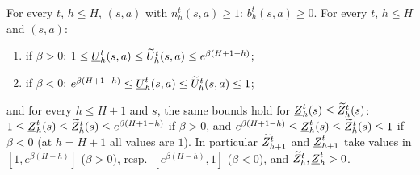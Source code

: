 \begin{lemma}\label{lem:backups_range}
\leanok
{}
For every $t$, $h \le H$, $(s, a)$ with $n_h^t(s, a) \ge 1$: $b_h^t(s, a) \ge 0$. For every $t$,
$h \le H$ and $(s, a)$:
\begin{enumerate}
  \item[(i)] if $\beta > 0$: $1 \le \underline{U}^t_h(s, a) \le \widetilde{U}^t_h(s, a) \le e^{\beta(H + 1 - h)}$;
  \item[(ii)] if $\beta < 0$: $e^{\beta(H + 1 - h)} \le \underline{U}^t_h(s, a) \le \widetilde{U}^t_h(s, a) \le 1$;
\end{enumerate}
and for every $h \le H + 1$ and $s$, the same bounds hold for $\underline{Z}^t_h(s) \le \widetilde{Z}^t_h(s)$:
$1 \le \underline{Z}^t_h(s) \le \widetilde{Z}^t_h(s) \le e^{\beta(H + 1 - h)}$ if $\beta > 0$, and
$e^{\beta(H + 1 - h)} \le \underline{Z}^t_h(s) \le \widetilde{Z}^t_h(s) \le 1$ if $\beta < 0$ (at $h = H + 1$ all
values are $1$). In particular $\widetilde{Z}^t_{h+1}$ and $\underline{Z}^t_{h+1}$ take values in $[1, e^{\beta(H - h)}]$
($\beta > 0$), resp.\ $[e^{\beta(H - h)}, 1]$ ($\beta < 0$), and $\widetilde{Z}^t_h, \underline{Z}^t_h > 0$.
\end{lemma}

